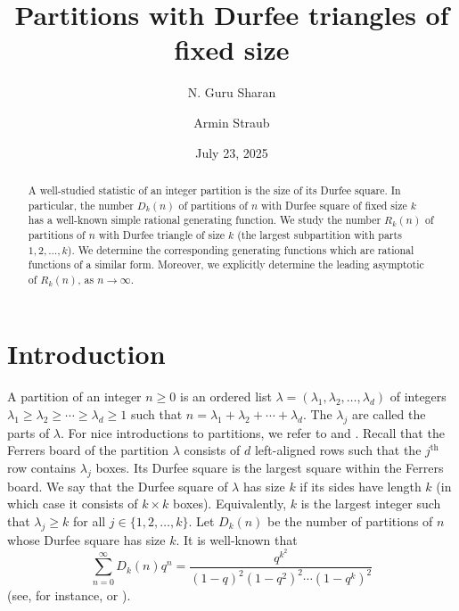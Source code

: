 \documentclass[11pt]{article}
\theoremstyle{plain}
\theoremstyle{definition}
\begin{document}
\title{Partitions with Durfee triangles of fixed size}

\author{
  N. Guru Sharan
  \and
  Armin Straub
}

\date{July 23, 2025}

\maketitle

\begin{abstract}
  A well-studied statistic of an integer partition is the size of its Durfee
  square. In particular, the number $D_k (n)$ of partitions of $n$ with Durfee
  square of fixed size $k$ has a well-known simple rational generating
  function. We study the number $R_k (n)$ of partitions of $n$ with Durfee
  triangle of size $k$ (the largest subpartition with parts $1, 2, \ldots,
  k$). We determine the corresponding generating functions which are rational
  functions of a similar form. Moreover, we explicitly determine the leading
  asymptotic of $R_k (n)$, as $n \rightarrow \infty$.
\end{abstract}

\section{Introduction}

A partition of an integer $n \geq 0$ is an ordered list $\lambda =
(\lambda_1, \lambda_2, \ldots, \lambda_d)$ of integers $\lambda_1 \geq
\lambda_2 \geq \cdots \geq \lambda_d \geq 1$ such that $n =
\lambda_1 + \lambda_2 + \cdots + \lambda_d$. The $\lambda_j$ are called the
parts of $\lambda$. For nice introductions to partitions, we refer to
\cite{andrews-part} and \cite{ae-partitions}. Recall that the Ferrers
board of the partition $\lambda$ consists of $d$ left-aligned rows such that
the $j^{\text{th}}$ row contains $\lambda_j$ boxes. Its Durfee square is the
largest square within the Ferrers board. We say that the Durfee square of
$\lambda$ has size $k$ if its sides have length $k$ (in which case it consists
of $k \times k$ boxes). Equivalently, $k$ is the largest integer such that
$\lambda_j \geq k$ for all $j \in \{ 1, 2, \ldots, k \}$. Let $D_k (n)$
be the number of partitions of $n$ whose Durfee square has size $k$. It is
well-known that
\begin{equation}
  \sum_{n = 0}^{\infty} D_k (n) q^n = \frac{q^{k^2}}{(1 - q)^2 (1 - q^2)^2
  \cdots (1 - q^k)^2} \label{eq:Dk:gf:rat:intro}
\end{equation}
(see, for instance, \cite[p.~28]{andrews-part} or
\cite[Section~8.1]{ae-partitions}).
\end{document}
